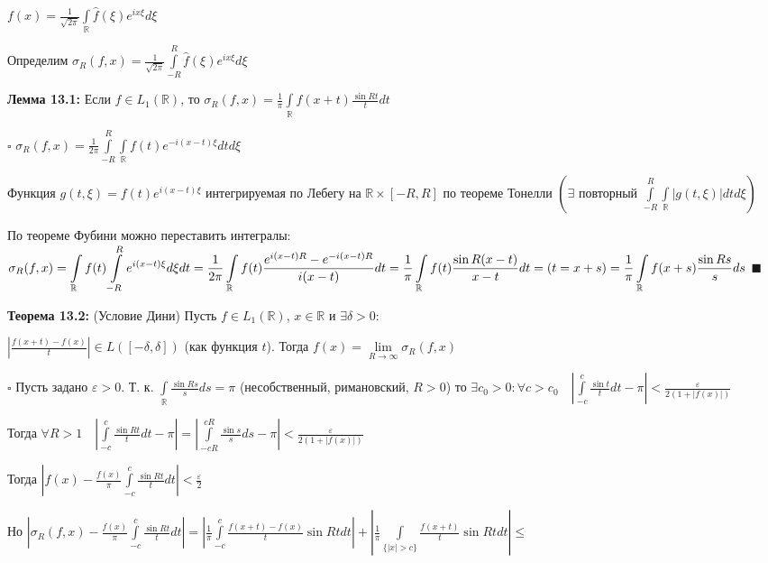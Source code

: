 \documentclass[a4paper]{report}
\newcommand*{\hm}[1]{#1\nobreak\discretionary{}%
            {\hbox{$\mathsurround=0pt #1$}}{}}
\begin{document}
$f(x)=\displaystyle\frac1{\sqrt{2\pi}}\displaystyle\int\limits_{\mathbb R}\hat f(\xi)e^{ix\xi}d\xi$
\bigskip

Определим $\sigma_R(f,x)=\displaystyle\frac{1}{\sqrt{2\pi}}\displaystyle\int\limits_{-R}^R\hat f(\xi)e^{ix\xi}d\xi$

\noindent\textbf{Лемма 13.1:} Если $f\in L_1(\mathbb R)$, то $\sigma_R(f,x)=\displaystyle\frac1\pi\displaystyle\int\limits_{\mathbb R}f(x+t)\frac{\sin Rt}{t}dt$

\noindent $\square$ $\sigma_R(f,x)=\displaystyle\frac1{2\pi}\displaystyle\int\limits_{-R}^R\displaystyle\int\limits_{\mathbb R}f(t)e^{-i(x-t)\xi}dtd\xi$

Функция $g(t,\xi)=f(t)e^{i(x-t)\xi}$ интегрируемая по Лебегу на $\mathbb R\times[-R,R]$ по теореме Тонелли $\left(\exists\text{ повторный }\displaystyle\int\limits_{-R}^R\displaystyle\int\limits_{\mathbb R}|g(t,\xi)|dtd\xi\right)$

По теореме Фубини можно переставить интегралы: $\sigma_R(f,x)=\displaystyle\int\limits_{\mathbb R}f(t)\displaystyle\int\limits_{-R}^R e^{i(x-t)\xi}d\xi dt\hm=\frac1{2\pi}\displaystyle\int\limits_{\mathbb R}f(t)\frac{e^{i(x-t)R}-e^{-i(x-t)R}}{i(x-t)}dt=\frac1\pi\displaystyle\int\limits_{\mathbb R}f(t)\frac{\sin R(x-t)}{x-t}dt=(t=x+s)\hm=\frac1\pi\displaystyle\int\limits_{\mathbb R}f(x+s)\frac{\sin Rs}{s}ds$ $\blacksquare$
\bigskip

\noindent\textbf{Теорема 13.2:} (Условие Дини) Пусть $f\in L_1(\mathbb R)$, $x\in\mathbb R$ и $\exists\delta>0\colon$

$\left|\displaystyle\frac{f(x+t)-f(x)}{t}\right|\in L([-\delta,\delta])$ (как функция $t$). Тогда $f(x)=\lim\limits_{R\to\infty}\sigma_R(f,x)$

\noindent $\square$ Пусть задано $\varepsilon>0$. Т. к. $\displaystyle\int\limits_{\mathbb R}\frac{\sin Rs}{s}ds=\pi$ (несобственный, римановский, $R>0$) то $\exists c_0>0\colon\forall c>c_0\quad\left|\displaystyle\int\limits_{-c}^c\frac{\sin t}{t}dt-\pi\right|<\displaystyle\frac{\varepsilon}{2(1+|f(x)|)}$

Тогда $\forall R>1\quad\left|\displaystyle\int\limits_{-c}^c\displaystyle\frac{\sin Rt}{t}dt-\pi\right|=\left|\displaystyle\int\limits_{-cR}^{cR}\frac{\sin s}{s}ds-\pi\right|<\displaystyle\frac{\varepsilon}{2(1+|f(x)|)}$

Тогда $\left|f(x)-\displaystyle\frac{f(x)}{\pi}\displaystyle\int\limits_{-c}^c\frac{\sin Rt}{t}dt\right|<\displaystyle\frac\varepsilon2$

Но $\left|\sigma_R(f,x)-\displaystyle\frac{f(x)}{\pi}\displaystyle\int\limits_{-c}^c\frac{\sin Rt}{t}dt\right|=\left|\displaystyle\frac1\pi\displaystyle\int\limits_{-c}^c\frac{f(x+t)-f(x)}{t}\sin Rtdt\right|+\left|\displaystyle\frac1\pi\displaystyle\int\limits_{\{|x|>c\}}\frac{f(x+t)}{t}\sin Rtdt\right|\le$
\end{document}
